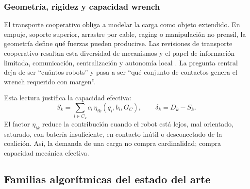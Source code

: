 \subsubsection{Geometría, rigidez y capacidad wrench}

El transporte cooperativo obliga a modelar la carga como objeto extendido. En empuje,
soporte superior, arrastre por cable, caging o manipulación no prensil, la geometría
define qué fuerzas pueden producirse. Las revisiones de transporte cooperativo resaltan
esta diversidad de mecanismos y el papel de información limitada, comunicación,
centralización y autonomía local \citep{tuci2018cooperative,farivarnejad2022multirobot}.
La pregunta central deja de ser ``cuántos robots'' y pasa a ser ``qué conjunto de contactos
genera el wrench requerido con margen''.

Esta lectura justifica la capacidad efectiva:
\[
  S_k = \sum_{i\in C_k} c_i\,\eta_{ik}(q_i,b_i,G_C),
  \qquad
  \delta_k = D_k - S_k .
\]
El factor $\eta_{ik}$ reduce la contribución cuando el robot está lejos, mal orientado,
saturado, con batería insuficiente, en contacto inútil o desconectado de la coalición.
Así, la demanda de una carga no compra cardinalidad; compra capacidad mecánica efectiva.



\subsection{Familias algorítmicas del estado del arte}

